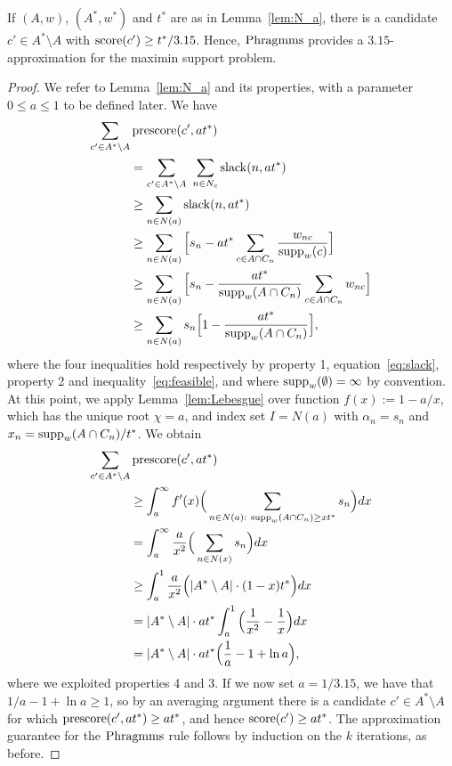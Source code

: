 \begin{lemma}\label{lem:candidate315}
If $(A,w)$, $(A^*,w^*)$ and $t^*$ are as in Lemma~\ref{lem:N_a}, there is a candidate $c'\in A^*\setminus A$ with $\operatorname{score}(c')\geq t^*/3.15$. Hence, $\operatorname{Phragmms}$ provides a $3.15$-approximation for the maximin support problem.
\end{lemma}

\begin{proof}
We refer to Lemma~\ref{lem:N_a} and its properties, with a parameter $0\leq a\leq 1$ to be defined later. We have
\begin{align*}
    \sum_{c'\in A^*\setminus A} & \operatorname{prescore}(c',at^*) \\ 
		&= \sum_{c'\in A^*\setminus A} \ \sum_{n\in N_c} \operatorname{slack}(n, at^*) \\
		&\geq \sum_{n\in N(a)} \operatorname{slack}(n, at^*) \\
    &\geq \sum_{n\in N(a)} \Big[ s_n - at^* \sum_{c\in A\cap C_n} \frac{w_{nc}}{\operatorname{supp}_w(c)} \Big] \\
    &\geq \sum_{n\in N(a)} \Big[ s_n - \frac{at^*}{\operatorname{supp}_w(A\cap C_n)} \sum_{c\in A\cap C_n} w_{nc} \Big] \\
    &\geq \sum_{n\in N(a)} s_n\Big[ 1- \frac{at^*}{\operatorname{supp}_w(A\cap C_n)} \Big], 
\end{align*}
%
where the four inequalities hold respectively by property 1, equation~\ref{eq:slack}, property 2 and inequality~\ref{eq:feasible}, and where $\operatorname{supp}_w(\emptyset)=\infty$ by convention. 
At this point, we apply Lemma~\ref{lem:Lebesgue} over function $f(x):=1-a/x$, which has the unique root $\chi=a$, and index set $I=N(a)$ with $\alpha_n=s_n$ and $x_n=\operatorname{supp}_w(A\cap C_n)/t^*$. We obtain
\begin{align*}
    \sum_{c'\in A^*\setminus A} & \prescore(c',at^*) \\
		&\geq \int_{a}^{\infty} f'(x) \Big( \sum_{n\in N(a): \ \supp_w(A\cap C_n)\geq xt^*} s_n \Big)dx\\
    &=\int_{a}^{\infty} \frac{a}{x^2}\Big( \sum_{n\in N(x)} s_n \Big)dx \\
    &\geq \int_{a}^1 \frac{a}{x^2} \Big( |A^*\setminus A|\cdot (1-x)t^* \Big)dx \\
    & = |A^*\setminus A|\cdot at^* \int_{a}^1 \Big( \frac{1}{x^2} - \frac{1}{x} \Big)dx \\
		&= |A^*\setminus A|\cdot at^*\Big(\frac{1}{a} - 1 + \ln  a\Big),
\end{align*}
%
where we exploited properties 4 and 3. 
If we now set $a=1/3.15$, we have that $1/a - 1 + \ln a\geq 1$, so by an averaging argument there is a candidate $c'\in A^*\setminus A$ for which $\operatorname{prescore}(c',at^*)\geq at^*$, and hence $\operatorname{score}(c')\geq at^*$. The approximation guarantee for the $\operatorname{Phragmms}$ rule follows by induction on the $k$ iterations, as before.
\end{proof}
